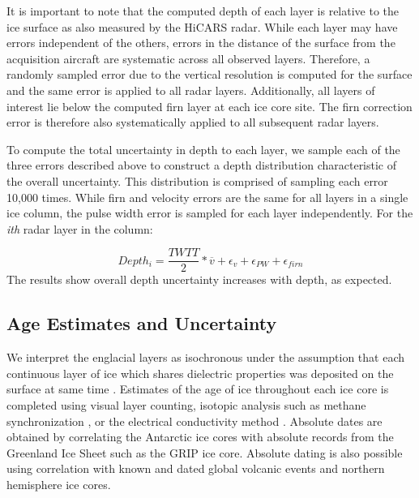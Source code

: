 \documentclass[12pt]{article}
\begin{document}

It is important to note that the computed depth of each layer is relative to the ice surface as also measured by the HiCARS radar. While each layer may have errors independent of the others, errors in the distance of the surface from the acquisition aircraft are systematic across all observed layers. Therefore, a randomly sampled error due to the vertical resolution is computed for the surface and the same error is applied to all radar layers. Additionally, all layers of interest lie below the computed firn layer at each ice core site. The firn correction error is therefore also systematically applied to all subsequent radar layers. 

To compute the total uncertainty in depth to each layer, we sample each of the three errors described above to construct a depth distribution characteristic of the overall uncertainty. This distribution is comprised of sampling each error 10,000 times. While firn and velocity errors are the same for all layers in a single ice column, the pulse width error is sampled for each layer independently. For the \textit{ith} radar layer in the column:

\begin{equation}\label{deptheqn}
Depth_i = \frac{TWTT}{2}*\overline{v} + \epsilon_{v} + \epsilon_{PW} + \epsilon_{firn}
\end{equation}
The results show overall depth uncertainty increases with depth, as expected. 


\subsection{Age Estimates and Uncertainty}\label{ageunc}

We interpret the englacial layers as isochronous under the assumption that each continuous layer of ice which shares dielectric properties was deposited on the surface at same time \citep{eisen2004}. Estimates of the age of ice throughout each ice core is completed using visual layer counting, isotopic analysis such as methane synchronization \citep{buizert2015}, or the electrical conductivity method \citep{hammer1997}. Absolute dates are obtained by correlating the Antarctic ice cores with absolute records from the Greenland Ice Sheet such as the GRIP %
ice core. Absolute dating is also possible using correlation with known and dated global volcanic events and northern hemisphere ice cores. 
\end{document}
